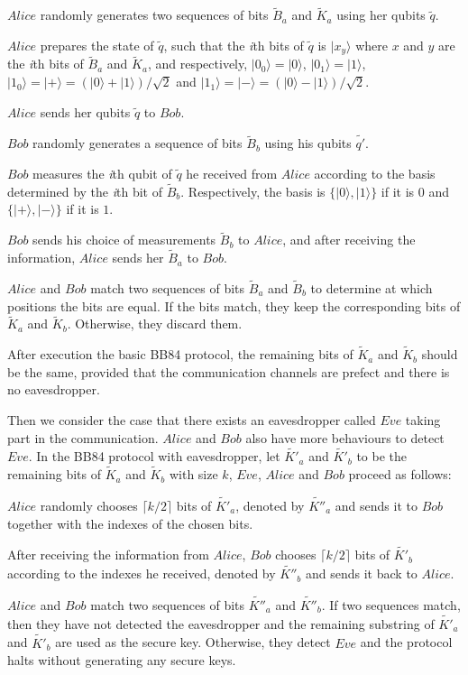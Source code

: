 \documentclass[a4paper,UKenglish,cleveref, autoref]{lipics-v2019}
\begin{document}
\begin{bracketenumerate}
    \item $Alice$ randomly generates two sequences of bits $\tilde{B}_a$ and $\tilde{K}_a$ using her qubits $\tilde{q}$.
    \item $Alice$ prepares the state of $\tilde{q}$, such that the \textit{i}th bits of $\tilde{q}$ is $|x_{y}\rangle$ where $x$ and $y$ are the \textit{i}th bits of $\tilde{B}_a$ and $\tilde{K}_a$, and respectively,  $|0_0\rangle=|0\rangle$, $|0_1\rangle=|1\rangle$, $|1_0\rangle=|+\rangle=(|0\rangle+|1\rangle)/\sqrt{2}$ and $|1_1\rangle=|-\rangle=(|0\rangle-|1\rangle)/\sqrt{2}$.
    \item $Alice$ sends her qubits $\tilde{q}$ to $Bob$.
    \item $Bob$ randomly generates a sequence of bits $\tilde{B}_b$ using his qubits $\tilde{q'}$.
    \item $Bob$ measures the \textit{i}th qubit of $\tilde{q}$ he received from $Alice$ according to the basis determined by the \textit{i}th bit of $\tilde{B}_b$. Respectively, the basis is $\{|0\rangle,|1\rangle\}$ if it is $0$ and $\{|+\rangle,|-\rangle\}$ if it is $1$.
    \item $Bob$ sends his choice of measurements $\tilde{B}_{b}$ to $Alice$, and after receiving the information, $Alice$ sends her $\tilde{B}_{a}$ to $Bob$.
    \item $Alice$ and $Bob$ match two sequences of bits $\tilde{B}_{a}$ and $\tilde{B}_{b}$ to determine at which positions the bits are equal. If the bits match, they keep the corresponding bits of $\tilde{K}_a$ and $\tilde{K}_b$. Otherwise, they discard them.
\end{bracketenumerate}
After execution the basic BB84 protocol, the remaining bits of $\tilde{K}_a$ and $\tilde{K}_b$ should be the same, provided that the communication channels are prefect and there is no eavesdropper.

Then we consider the case that there exists an eavesdropper called $Eve$ taking part in the communication. $Alice$ and $Bob$ also have more behaviours to detect $Eve$. In the BB84 protocol with eavesdropper, let $\tilde{K'}_a$ and $\tilde{K'}_b$ to be the remaining bits of $\tilde{K}_a$ and $\tilde{K}_b$ with size $k$, $Eve$, $Alice$ and $Bob$ proceed as follows:
\begin{bracketenumerate}
    \item $Alice$ randomly chooses $\lceil k/2\rceil$ bits of $\tilde{K'}_a$, denoted by $\tilde{K''}_a$ and sends it to $Bob$ together with the indexes of the chosen bits.
    \item After receiving the information from $Alice$, $Bob$ chooses $\lceil k/2\rceil$ bits of $\tilde{K'}_b$ according to the indexes he received, denoted by $\tilde{K''}_b$ and sends it back to $Alice$.
    \item $Alice$ and $Bob$ match two sequences of bits $\tilde{K''}_{a}$ and $\tilde{K''}_{b}$. If two sequences match, then they have not detected the eavesdropper and the remaining substring of $\tilde{K'}_{a}$ and $\tilde{K'}_{b}$ are used as the secure key. Otherwise, they detect $Eve$ and the protocol halts without generating any secure keys.
\end{bracketenumerate}
\end{document}
